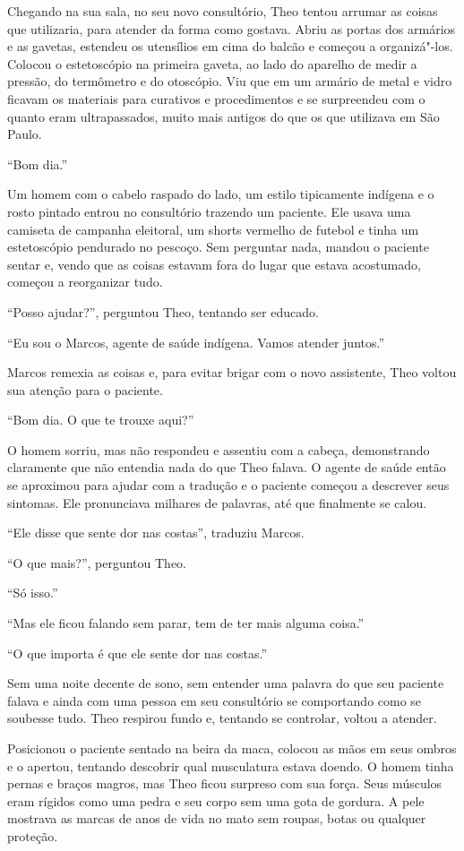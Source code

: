Chegando na sua sala, no seu novo consultório, Theo tentou arrumar as
coisas que utilizaria, para atender da forma como gostava. Abriu as
portas dos armários e as gavetas, estendeu os utensílios em cima do
balcão e começou a organizá"-los. Colocou o estetoscópio na primeira
gaveta, ao lado do aparelho de medir a pressão, do termômetro e do
otoscópio. Viu que em um armário de metal e vidro ficavam os materiais
para curativos e procedimentos e se surpreendeu com o quanto
eram ultrapassados, muito mais antigos do que os que utilizava em
São Paulo.

``Bom dia.''

Um homem com o cabelo raspado do lado, um estilo tipicamente indígena
e o rosto pintado entrou no consultório trazendo um paciente. Ele
usava uma camiseta de campanha eleitoral, um shorts vermelho de futebol
e tinha um estetoscópio pendurado no pescoço. Sem perguntar nada, mandou
o paciente sentar e, vendo que as coisas estavam fora do lugar que
estava acostumado, começou a reorganizar tudo.

``Posso ajudar?'', perguntou Theo, tentando ser educado.

``Eu sou o Marcos, agente de saúde indígena. Vamos atender juntos.''

Marcos remexia as coisas e, para evitar brigar com o novo assistente,
Theo voltou sua atenção para o paciente.

``Bom dia. O que te trouxe aqui?''

O homem sorriu, mas não respondeu e assentiu com a cabeça, demonstrando
claramente que não entendia nada do que Theo falava. O agente de saúde
então se aproximou para ajudar com a tradução e o paciente começou a
descrever seus sintomas. Ele pronunciava milhares de palavras, até que
finalmente se calou.

``Ele disse que sente dor nas costas'', traduziu Marcos.

``O que mais?'', perguntou Theo.

``Só isso.''

``Mas ele ficou falando sem parar, tem de ter mais alguma coisa.''

``O que importa é que ele sente dor nas costas.''

Sem uma noite decente de sono, sem entender uma palavra do que seu
paciente falava e ainda com uma pessoa em seu consultório se comportando
como se soubesse tudo. Theo respirou fundo e, tentando se controlar,
voltou a atender.

Posicionou o paciente sentado na beira da maca, colocou as mãos em seus
ombros e o apertou, tentando descobrir qual musculatura estava doendo. O
homem tinha pernas e braços magros, mas Theo ficou surpreso com sua
força. Seus músculos eram rígidos como uma pedra e seu corpo sem uma
gota de gordura. A pele mostrava as marcas de anos de vida no mato sem
roupas, botas ou qualquer proteção.

